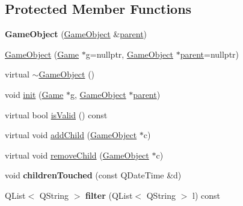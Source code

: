 \subsection*{\-Protected \-Member \-Functions}
\begin{DoxyCompactItemize}
\item 
\hypertarget{class_game_object_a7f99ba7231f83306f28a23923329f153}{{\bfseries \-Game\-Object} (\hyperlink{class_game_object}{\-Game\-Object} \&\hyperlink{class_game_object_af3deaf39cde23c189765634e32e95bb4}{parent})}\label{class_game_object_a7f99ba7231f83306f28a23923329f153}

\item 
\hyperlink{class_game_object_ab00c537faf6eb4439c60003141a763b9}{\-Game\-Object} (\hyperlink{class_game}{\-Game} $\ast$g=nullptr, \hyperlink{class_game_object}{\-Game\-Object} $\ast$\hyperlink{class_game_object_af3deaf39cde23c189765634e32e95bb4}{parent}=nullptr)
\item 
virtual \hyperlink{class_game_object_ab82dfdb656f9051c0587e6593b2dda97}{$\sim$\-Game\-Object} ()
\item 
void \hyperlink{class_game_object_abb6a1fa1a89307820874179b20010f6d}{init} (\hyperlink{class_game}{\-Game} $\ast$g, \hyperlink{class_game_object}{\-Game\-Object} $\ast$\hyperlink{class_game_object_af3deaf39cde23c189765634e32e95bb4}{parent})
\item 
virtual bool \hyperlink{class_game_object_a88676a10f8e905747f1d64c2da490524}{is\-Valid} () const 
\item 
virtual void \hyperlink{class_game_object_a4733a1081db3c2d0a9be225265283ad8}{add\-Child} (\hyperlink{class_game_object}{\-Game\-Object} $\ast$c)
\item 
virtual void \hyperlink{class_game_object_a21dc679cb474b147b7d7d336117ffe58}{remove\-Child} (\hyperlink{class_game_object}{\-Game\-Object} $\ast$c)
\item 
\hypertarget{class_game_object_a4e57d5a3f8be6882e5d7f2a2e5d45ccd}{void {\bfseries children\-Touched} (const \-Q\-Date\-Time \&d)}\label{class_game_object_a4e57d5a3f8be6882e5d7f2a2e5d45ccd}

\item 
\hypertarget{class_game_object_a05c00e0f34a146c91275fb67ce62dfcf}{\-Q\-List$<$ \-Q\-String $>$ {\bfseries filter} (\-Q\-List$<$ \-Q\-String $>$ l) const }\label{class_game_object_a05c00e0f34a146c91275fb67ce62dfcf}

\end{DoxyCompactItemize}
